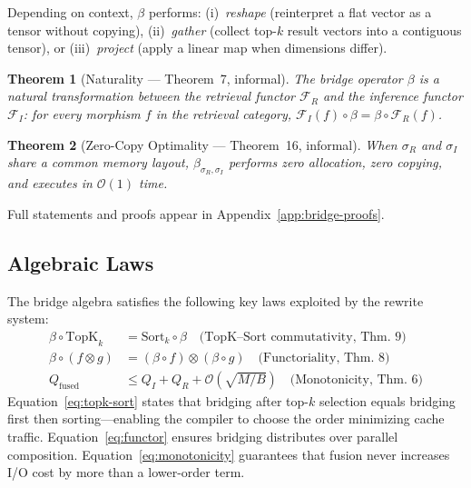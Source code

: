 \documentclass{article}
\newtheorem{theorem}{Theorem}
\theoremstyle{definition}
\theoremstyle{remark}
\newcommand{\BigO}{\mathcal{O}}
\newcommand{\Qfused}{Q_{\mathrm{fused}}}
\begin{document}
Depending on context, $\beta$ performs: (i)~\emph{reshape} (reinterpret a flat vector as a tensor without copying), (ii)~\emph{gather} (collect top-$k$ result vectors into a contiguous tensor), or (iii)~\emph{project} (apply a linear map when dimensions differ).

\begin{theorem}[Naturality --- Theorem~7, informal]\label{thm:naturality-main}
The bridge operator $\beta$ is a natural transformation between the retrieval functor $\mathcal{F}_R$ and the inference functor $\mathcal{F}_I$: for every morphism $f$ in the retrieval category, $\mathcal{F}_I(f) \circ \beta = \beta \circ \mathcal{F}_R(f)$.
\end{theorem}

\begin{theorem}[Zero-Copy Optimality --- Theorem~16, informal]\label{thm:zerocopy-main}
When $\sigma_R$ and $\sigma_I$ share a common memory layout, $\beta_{\sigma_R, \sigma_I}$ performs zero allocation, zero copying, and executes in $\BigO(1)$ time.
\end{theorem}

Full statements and proofs appear in Appendix~\ref{app:bridge-proofs}.

\subsection{Algebraic Laws}

The bridge algebra satisfies the following key laws exploited by the rewrite system:
\begin{align}
  \beta \circ \mathrm{TopK}_k &= \mathrm{Sort}_k \circ \beta \quad \text{(TopK--Sort commutativity, Thm.~9)} \label{eq:topk-sort} \\
  \beta \circ (f \otimes g) &= (\beta \circ f) \otimes (\beta \circ g) \quad \text{(Functoriality, Thm.~8)} \label{eq:functor} \\
  \Qfused &\leq Q_I + Q_R + \BigO(\sqrt{M/B}) \quad \text{(Monotonicity, Thm.~6)} \label{eq:monotonicity}
\end{align}
Equation~\eqref{eq:topk-sort} states that bridging after top-$k$ selection equals bridging first then sorting---enabling the compiler to choose the order minimizing cache traffic.
Equation~\eqref{eq:functor} ensures bridging distributes over parallel composition.
Equation~\eqref{eq:monotonicity} guarantees that fusion never increases I/O cost by more than a lower-order term.

\end{document}
